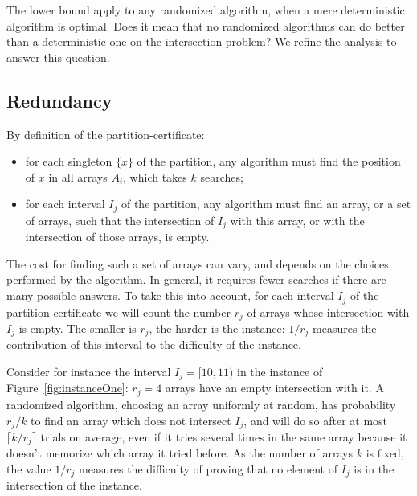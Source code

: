 The lower bound apply to any randomized algorithm, when a mere
deterministic algorithm is optimal.
%
Does it mean that no randomized algorithms can do better than a
deterministic one on the intersection problem?
%
We refine the analysis to answer this question.




\subsection{Redundancy~\cite{optimalityOfRandomizedAlgorithmsForTheIntersectionProblem,alternationAndRedundancyAnalysisOfTheIntersectionProblem}}
\label{sec:redundancy}





By definition of the partition-certificate:
\begin{itemize}
\item for each singleton $\{x\}$ of the partition, any algorithm must
find the position of $x$ in all arrays $A_i$, which takes $k$ searches;
\item for each interval $I_j$ of the partition, any algorithm must
find an array, or a set of arrays, such that the intersection of $I_j$
with this array, or with the intersection of those arrays, is empty.
\end{itemize}
%
The cost for finding such a set of arrays can vary, and depends on the
choices performed by the algorithm.
%
In general, it requires fewer searches if there are many possible
answers.
%
To take this into account, for each interval $I_j$ of the
partition-certificate we will count the number $r_j$ of arrays whose
intersection with $I_j$ is empty.
%
The smaller is $r_j$, the harder is the instance: $1/r_j$ measures
the contribution of this interval to the difficulty of the instance.
%
\begin{example}
Consider for instance the interval $I_j=[10,11)$ in the instance of
Figure~\ref{fig:instanceOne}: $r_j=4$ arrays have an empty
intersection with it.
%
A randomized algorithm, choosing an array uniformly at random, has
probability $r_j/k$ to find an array which does not intersect $I_j$,
and will do so after at most $\lceil k/r_j\rceil$ trials on average,
even if it tries several times in the
same array because it doesn't memorize which array it tried before.
%
As the number of arrays $k$ is fixed, 
the value $1/r_j$ measures the difficulty of proving that no element
of $I_j$ is in the intersection of the instance.
\end{example}

